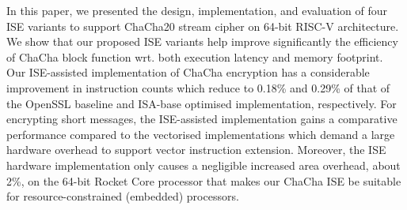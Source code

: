 In this paper, we presented the design, implementation, and evaluation of four ISE variants to support ChaCha20 stream cipher on 64-bit RISC-V architecture.
We show that our proposed ISE variants help improve significantly the efficiency of ChaCha block function wrt. both execution latency and memory footprint.  
Our ISE-assisted implementation of ChaCha encryption has a considerable improvement in instruction counts which reduce to 0.18\% and 0.29\% of that of the OpenSSL baseline and ISA-base optimised implementation, respectively. 
For encrypting short messages, the ISE-assisted implementation gains a comparative performance compared to the vectorised implementations which demand a large hardware overhead to support vector instruction extension.
Moreover, the ISE hardware implementation only causes a negligible increased area overhead, about 2\%, on the 64-bit Rocket Core processor that makes our ChaCha ISE be suitable for resource-constrained (embedded) processors.





